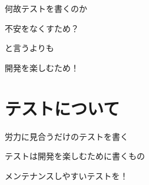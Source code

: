 \begin{frame}
\begin{center}
{\Huge
\item 何故テストを書くのか
}
\end{center}
\end{frame}

\begin{frame}
\begin{center}
{\Huge
\item 不安をなくすため？
}
\end{center}
\end{frame}

\begin{frame}
\begin{center}
{\Huge
\item と言うよりも
}
\end{center}
\end{frame}

\begin{frame}
\begin{center}
{\Huge
開発を楽しむため！
}
\end{center}
\end{frame}

\section{テストについて}

\begin{frame}
\begin{itemize}
{\huge
\item{} 労力に見合うだけのテストを書く
\item{} テストは開発を楽しむために書くもの
\item{} メンテナンスしやすいテストを！
}
\end{itemize}
\end{frame}
